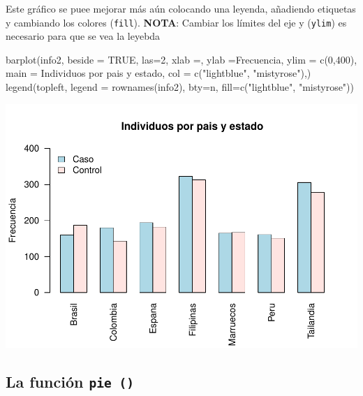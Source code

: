 \documentclass[
]{book}
\newenvironment{Shaded}{\begin{snugshade}}{\end{snugshade}}
\newcommand{\AttributeTok}[1]{\textcolor[rgb]{0.77,0.63,0.00}{#1}}
\newcommand{\ConstantTok}[1]{\textcolor[rgb]{0.00,0.00,0.00}{#1}}
\newcommand{\DecValTok}[1]{\textcolor[rgb]{0.00,0.00,0.81}{#1}}
\newcommand{\FunctionTok}[1]{\textcolor[rgb]{0.00,0.00,0.00}{#1}}
\newcommand{\NormalTok}[1]{#1}
\newcommand{\StringTok}[1]{\textcolor[rgb]{0.31,0.60,0.02}{#1}}
\begin{document}
Este gráfico se puee mejorar más aún colocando una leyenda, añadiendo etiquetas y cambiando los colores (\texttt{fill}). \textbf{NOTA}: Cambiar los límites del eje y (\texttt{ylim}) es necesario para que se vea la leyebda

\begin{Shaded}
\begin{Highlighting}[]
\FunctionTok{barplot}\NormalTok{(info2, }\AttributeTok{beside =} \ConstantTok{TRUE}\NormalTok{, }\AttributeTok{las=}\DecValTok{2}\NormalTok{, }
        \AttributeTok{xlab =}\StringTok{\textquotesingle{}\textquotesingle{}}\NormalTok{, }\AttributeTok{ylab =}\StringTok{\textquotesingle{}Frecuencia\textquotesingle{}}\NormalTok{, }
        \AttributeTok{ylim =} \FunctionTok{c}\NormalTok{(}\DecValTok{0}\NormalTok{,}\DecValTok{400}\NormalTok{), }
        \AttributeTok{main =} \StringTok{\textquotesingle{}Individuos por pais y estado\textquotesingle{}}\NormalTok{, }
        \AttributeTok{col =} \FunctionTok{c}\NormalTok{(}\StringTok{"lightblue"}\NormalTok{, }\StringTok{"mistyrose"}\NormalTok{),)}
\FunctionTok{legend}\NormalTok{(}\StringTok{\textquotesingle{}topleft\textquotesingle{}}\NormalTok{, }\AttributeTok{legend =} \FunctionTok{rownames}\NormalTok{(info2), }
       \AttributeTok{bty=}\StringTok{\textquotesingle{}n\textquotesingle{}}\NormalTok{, }\AttributeTok{fill=}\FunctionTok{c}\NormalTok{(}\StringTok{"lightblue"}\NormalTok{, }\StringTok{"mistyrose"}\NormalTok{))}
\end{Highlighting}
\end{Shaded}

\includegraphics{fig/unnamed-chunk-104-1.pdf}

\hypertarget{la-funciuxf3n-pie}{%
\subsection{\texorpdfstring{La función \texttt{pie\ ()}}{La función pie ()}}\label{la-funciuxf3n-pie}}
\end{document}

